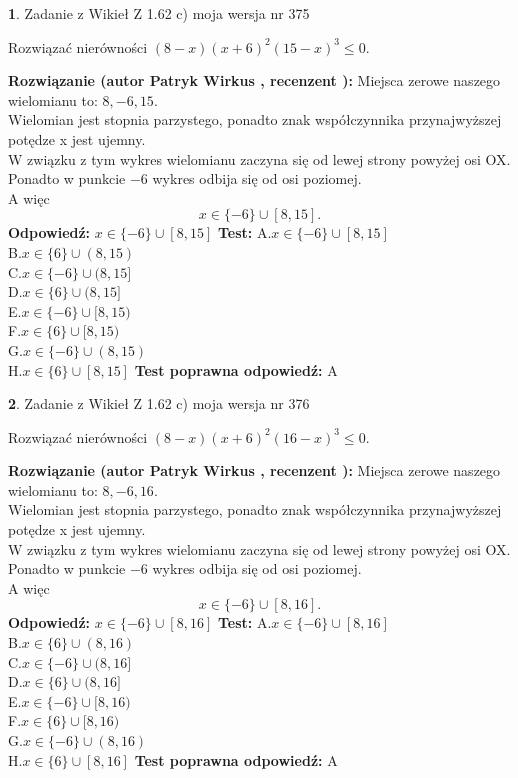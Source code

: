 \documentclass[12pt, a4paper]{article}
\theoremstyle{definition} %
\newtheorem{zad}{}
\newcommand{\zadStart}[1]{\begin{zad}#1\newline}
\newcommand{\zadStop}{\end{zad}}
\newcommand{\rozwStart}[2]{\noindent \textbf{Rozwiązanie (autor #1 , recenzent #2): }\newline}
\newcommand{\rozwStop}{\newline}
\newcommand{\odpStart}{\noindent \textbf{Odpowiedź:}\newline}
\newcommand{\odpStop}{\newline}
\newcommand{\testStart}{\noindent \textbf{Test:}\newline}
\newcommand{\testStop}{\newline}
\newcommand{\kluczStart}{\noindent \textbf{Test poprawna odpowiedź:}\newline}
\newcommand{\kluczStop}{\newline}
\begin{document}
\zadStart{Zadanie z Wikieł Z 1.62 c) moja wersja nr 375}

Rozwiązać nierówności $(8-x)(x+6)^{2}(15-x)^{3}\le0$.
\zadStop
\rozwStart{Patryk Wirkus}{}
Miejsca zerowe naszego wielomianu to: $8, -6, 15$.\\
Wielomian jest stopnia parzystego, ponadto znak współczynnika przy\linebreak najwyższej potędze x jest ujemny.\\ W związku z tym wykres wielomianu zaczyna się od lewej strony powyżej osi OX.\\
Ponadto w punkcie $-6$ wykres odbija się od osi poziomej.\\
A więc $$x \in \{-6\} \cup [8,15].$$
\rozwStop
\odpStart
$x \in \{-6\} \cup [8,15]$
\odpStop
\testStart
A.$x \in \{-6\} \cup [8,15]$\\
B.$x \in \{6\} \cup (8,15)$\\
C.$x \in \{-6\} \cup (8,15]$\\
D.$x \in \{6\} \cup (8,15]$\\
E.$x \in \{-6\} \cup [8,15)$\\
F.$x \in \{6\} \cup [8,15)$\\
G.$x \in \{-6\} \cup (8,15)$\\
H.$x \in \{6\} \cup [8,15]$
\testStop
\kluczStart
A
\kluczStop



\zadStart{Zadanie z Wikieł Z 1.62 c) moja wersja nr 376}

Rozwiązać nierówności $(8-x)(x+6)^{2}(16-x)^{3}\le0$.
\zadStop
\rozwStart{Patryk Wirkus}{}
Miejsca zerowe naszego wielomianu to: $8, -6, 16$.\\
Wielomian jest stopnia parzystego, ponadto znak współczynnika przy\linebreak najwyższej potędze x jest ujemny.\\ W związku z tym wykres wielomianu zaczyna się od lewej strony powyżej osi OX.\\
Ponadto w punkcie $-6$ wykres odbija się od osi poziomej.\\
A więc $$x \in \{-6\} \cup [8,16].$$
\rozwStop
\odpStart
$x \in \{-6\} \cup [8,16]$
\odpStop
\testStart
A.$x \in \{-6\} \cup [8,16]$\\
B.$x \in \{6\} \cup (8,16)$\\
C.$x \in \{-6\} \cup (8,16]$\\
D.$x \in \{6\} \cup (8,16]$\\
E.$x \in \{-6\} \cup [8,16)$\\
F.$x \in \{6\} \cup [8,16)$\\
G.$x \in \{-6\} \cup (8,16)$\\
H.$x \in \{6\} \cup [8,16]$
\testStop
\kluczStart
A
\kluczStop
\end{document}
